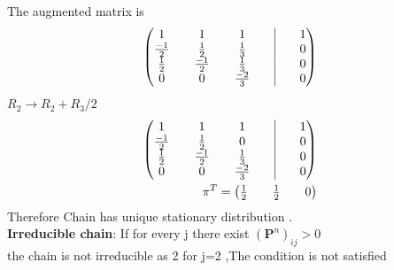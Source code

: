 \documentclass{beamer}
\providecommand{\brak}[1]{\ensuremath{\left(#1\right)}}
\theoremstyle{remark}
\newcommand{\myvec}[1]{\ensuremath{\begin{pmatrix}#1\end{pmatrix}}}
\let\vec\mathbf
\numberwithin{equation}{section}
\begin{document}
The augmented matrix is
\begin{align}
    \myvec{1 &&1&&1 && \vrule && 1\\\frac{-1}{2}&&\frac{1}{2}&& \frac{1}{3} && \vrule && 0\\\frac{1}{2} && \frac{-1}{2}&& \frac{1}{3}&& \vrule && 0\\0 && 0&& \frac{-2}{3} && \vrule && 0}
\end{align}
$R_2 \longrightarrow R_2+R_3/2 $
\begin{align}
    \myvec{1 &&1&&1 && \vrule && 1\\\frac{-1}{2}&&\frac{1}{2}&& 0 && \vrule && 0\\\frac{1}{2} && \frac{-1}{2}&& \frac{1}{3}&& \vrule && 0\\0 && 0&& \frac{-2}{3} && \vrule && 0}\\
    \vec{{\pi}}^T=\myvec{\frac{1}{2}&& \frac{1}{2} && 0}
\end{align}
Therefore Chain has unique stationary distribution .\\
\textbf{Irreducible chain}: If for every j there exist $\brak{\vec{P}^n}_{ij}> 0$\\
the chain is not irreducible as 2 for j=2 ,The condition is not satisfied
\end{document}
